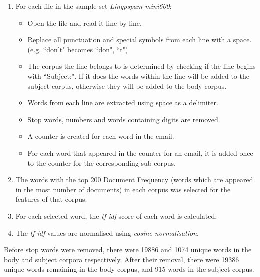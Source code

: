 \documentclass[10pt, a4paper]{article}
\begin{document}
\begin{enumerate}
\item For each file in the sample set \emph{Lingpspam-mini600}:
	\begin{itemize}
	\item Open the file and read it line by line.
	\item Replace all punctuation and special symbols from each line with a space. (e.g. ``don't" becomes ``don", ``t")
	\item The corpus the line belongs to is determined by checking if the line begins with ``Subject:". If it does the words within the line will be added to the subject corpus, otherwise they will be added to the body corpus.
	\item Words from each line are extracted using space as a delimiter.
	\item Stop words, numbers and words containing digits are removed.
	\item A counter is created for each word in the email.
	\item For each word that appeared in the counter for an email, it is added once to the counter for the corresponding sub-corpus.
	\end{itemize}
\item The words with the top 200 Document Frequency (words which are appeared in the most number of documents) in each corpus was selected for the features of that corpus.
\item For each selected word, the \emph{tf-idf} score of each word is calculated.
\item The \emph{tf-idf} values are normalised using \emph{cosine normalisation}.
\end{enumerate}

Before stop words were removed, there were 19886 and 1074 unique words in the body and subject corpora respectively. After their removal, there were 19386 unique words remaining in the body corpus, and 915 words in the subject corpus.
\end{document}
